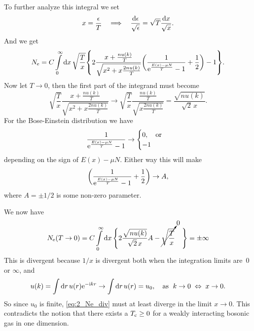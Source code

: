 \documentclass[11pt,letter, swedish, english
]{article}
\begin{document}
To further analyze this integral we set
\begin{equation}
x=\frac{\epsilon}{T}
\quad\Longrightarrow\quad
\frac{\mathrm{d}\epsilon}{\sqrt{\epsilon}}
=\sqrt{T}\frac{\mathrm{d} x}{\sqrt{x}}.
\end{equation}
And we get
\begin{equation}\label{eq:2_Ne_int}
\Ne=C\int_0^\infty\rd{x}\,\sqrt{\frac{T}{x}}
\qty{
2\frac{x+\frac{nu(k)}{T}}{\sqrt{x^2+x\frac{2nu(k)}{T}}}
\qty(\frac{1}{\ee^{\frac{E(x)-\mu N}{T}}-1}+\frac{1}{2})-1
}.
\end{equation}
Now let $T\to0$, then the first part of the integrand must become
\begin{equation}\label{eq:2_lim1}
\sqrt{\frac{T}{x}}
\frac{x+\frac{nu(k)}{T}}{\sqrt{x^2+x\frac{2nu(k)}{T}}}
\to \sqrt{\frac{T}{x}}
\frac{\frac{nu(k)}{T}}{\sqrt{x\frac{2nu(k)}{T}}}
=\frac{\sqrt{nu(k)}}{\sqrt{2}\,x}.
\end{equation}
For the Bose-Einstein distribution we have
\begin{equation}
\frac{1}{\ee^{\frac{E(x)-\mu N}{T}}-1}\to
\begin{cases}
0\qcomma\text{or}\\
-1
\end{cases}
\end{equation}
depending on the sign of $E(x)-\mu N$. Either way this will make
\begin{equation}
\qty(\frac{1}{\mathrm{e}^{\frac{E(x)-\mu N}{T}}-1}+\frac{1}{2})\to A,
\end{equation}
where $A=\pm1/2$ is some non-zero parameter. 

We now have
\begin{equation}\label{eq:2_Ne_div}
\Ne(T\to0)=C\int_0^\infty\rd{x}\,
\Bigg\{
2\frac{\sqrt{nu(k)}}{\sqrt{2}\,x}A
-\cancelto{0}{\sqrt{\frac{T}{x}}} \phantom{00}\Bigg\}
=\pm\infty
\end{equation}
This is divergent because $1/x$ is divergent both when the integration
limits are~0 or $\infty$, and 
\begin{equation}
u(k)=\int\rd{r}\, u(r)\ee^{-\ii kr}
\to\int\rd{r}\, u(r) = u_0 
\qcomma \text{as }\; k\to0 \;\Leftrightarrow\; x\to0.
\end{equation}
So since $u_0$ is finite, \eqref{eq:2_Ne_div} must at least diverge in
the limit $x\to 0$\footnotemark{}. This contradicts the notion that
there exists a $T_{\text{c}}\ge0$ for a weakly interacting bosonic gas in one
dimension. 
\end{document}
